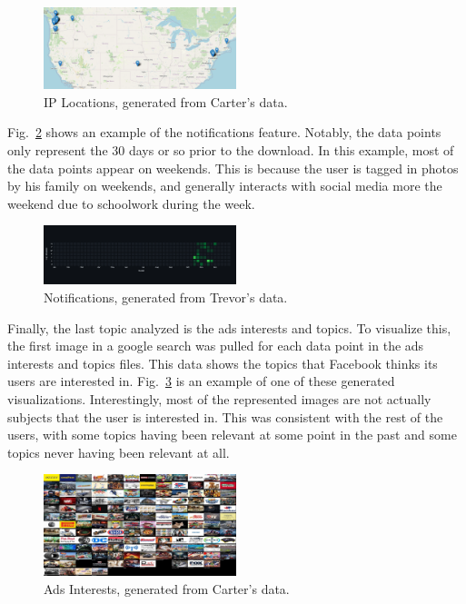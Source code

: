 \documentclass[conference, letterpaper, 11pt]{IEEEtran}
\begin{document}
\begin{figure}[htbp]
    \centering
    \includegraphics[width=0.5\textwidth]{img/ipl.png}
    \caption{IP Locations, generated from Carter's data.}
    \label{fig:ipl}
\end{figure}

Fig.~\ref{fig:ntf} shows an example of the notifications feature. Notably, the data points only represent the 30 days or so prior to the download. In this example, most of the data points appear on weekends. This is because the user is tagged in photos by his family on weekends, and generally interacts with social media more the weekend due to schoolwork during the week.

\begin{figure}[htbp]
    \centering
    \includegraphics[width=0.5\textwidth]{img/ntf.png}
    \caption{Notifications, generated from Trevor's data.}
    \label{fig:ntf}
\end{figure}

Finally, the last topic analyzed is the ads interests and topics. To visualize this, the first image in a google search was pulled for each data point in the ads interests and topics files. This data shows the topics that Facebook thinks its users are interested in. Fig.~\ref{fig:tps} is an example of one of these generated visualizations. Interestingly, most of the represented images are not actually subjects that the user is interested in. This was consistent with the rest of the users, with some topics having been relevant at some point in the past and some topics never having been relevant at all.

\begin{figure}[htbp]
    \centering
    \includegraphics[width=0.5\textwidth]{img/tps.png}
    \caption{Ads Interests, generated from Carter's data.}
    \label{fig:tps}
\end{figure}
\end{document}
